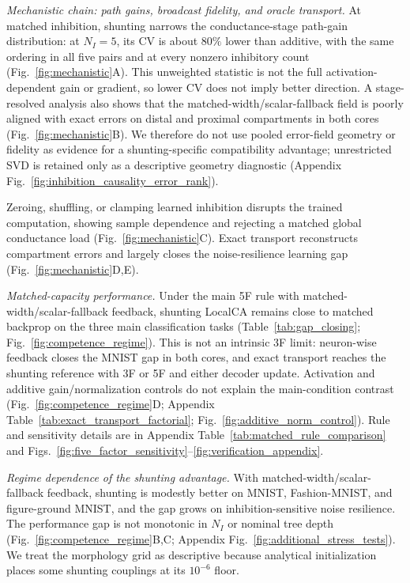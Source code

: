     \noindent\emph{Mechanistic chain: path gains, broadcast fidelity, and oracle transport.}
    At matched inhibition, shunting narrows the conductance-stage path-gain distribution: at $N_I{=}5$, its CV is about $80\%$ lower than additive, with the same ordering in all five pairs and at every nonzero inhibitory count (Fig.~\ref{fig:mechanistic}A). This unweighted statistic is not the full activation-dependent gain or gradient, so lower CV does not imply better direction. A stage-resolved analysis also shows that the matched-width/scalar-fallback field is poorly aligned with exact errors on distal and proximal compartments in both cores (Fig.~\ref{fig:mechanistic}B). We therefore do not use pooled error-field geometry or fidelity as evidence for a shunting-specific compatibility advantage; unrestricted SVD is retained only as a descriptive geometry diagnostic (Appendix Fig.~\ref{fig:inhibition_causality_error_rank}).
    
    Zeroing, shuffling, or clamping learned inhibition disrupts the trained computation, showing sample dependence and rejecting a matched global conductance load (Fig.~\ref{fig:mechanistic}C). Exact transport reconstructs compartment errors and largely closes the noise-resilience learning gap (Fig.~\ref{fig:mechanistic}D,E).
    
    \noindent\emph{Matched-capacity performance.}
    Under the main 5F rule with matched-width/scalar-fallback feedback, shunting LocalCA remains close to matched backprop on the three main classification tasks (Table~\ref{tab:gap_closing}; Fig.~\ref{fig:competence_regime}). This is not an intrinsic 3F limit: neuron-wise feedback closes the MNIST gap in both cores, and exact transport reaches the shunting reference with 3F or 5F and either decoder update. Activation and additive gain/normalization controls do not explain the main-condition contrast (Fig.~\ref{fig:competence_regime}D; Appendix Table~\ref{tab:exact_transport_factorial}; Fig.~\ref{fig:additive_norm_control}). Rule and sensitivity details are in Appendix Table~\ref{tab:matched_rule_comparison} and Figs.~\ref{fig:five_factor_sensitivity}--\ref{fig:verification_appendix}.
    
    \noindent\emph{Regime dependence of the shunting advantage.}
    With matched-width/scalar-fallback feedback, shunting is modestly better on MNIST, Fashion-MNIST, and figure-ground MNIST, and the gap grows on inhibition-sensitive noise resilience. The performance gap is not monotonic in $N_I$ or nominal tree depth (Fig.~\ref{fig:competence_regime}B,C; Appendix Fig.~\ref{fig:additional_stress_tests}). We treat the morphology grid as descriptive because analytical initialization places some shunting couplings at its $10^{-6}$ floor.

